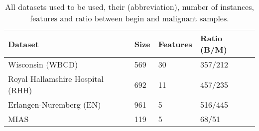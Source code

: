 \medskip
\begin{table}[ht!]
\begin{center}
   \begin{tabular}{l*{3}{l}}
   \hline
   Dataset         &
   Size  &
   Features  &
   Ratio (B/M)     \\
   \hline
   Wisconsin (WBCD)						 &
   569                         &
   30                          &
   357/212                     \\
   Royal Hallamshire Hospital (RHH)  &
   692                         &
   11                          &
   457/235                     \\
   Erlangen-Nuremberg (EN)     &
   961                         &
   5                           &
   516/445                     \\
   MIAS         							 &
   119                         &
   5                           &
   68/51                     	 \\
  \hline
  \end{tabular}
  \caption[]
  {\small All datasets used to be used, their (abbreviation), number of instances, features and ratio between begin and malignant samples. }
  \label{table:datasets_info}
\end{center}
\end{table}
